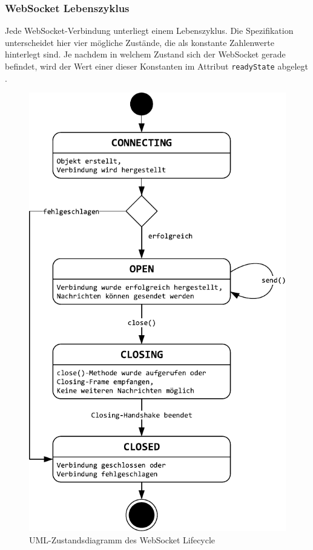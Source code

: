 \documentclass[11pt,a4paper,titlepage]{scrartcl}
\numberwithin{equation}{section}
\begin{document}
\subsubsection{WebSocket Lebenszyklus}
Jede WebSocket-Verbindung unterliegt einem Lebenszyklus. Die Spezifikation unterscheidet hier vier mögliche Zustände, die als konstante Zahlenwerte hinterlegt sind. Je nachdem in welchem Zustand sich der WebSocket gerade befindet, wird der Wert einer dieser Konstanten im Attribut \texttt{readyState} abgelegt \autocite{whatwg_html_2010}. \newpage
\begin{figure}[ht] 
	\begin{center}
		\includegraphics[scale=0.75]{img/wslifecycle.pdf}
		\caption{UML-Zustandsdiagramm des WebSocket Lifecycle}
		\label{fig:wsAPIZustand}
	\end{center}
\end{figure}
\end{document}
